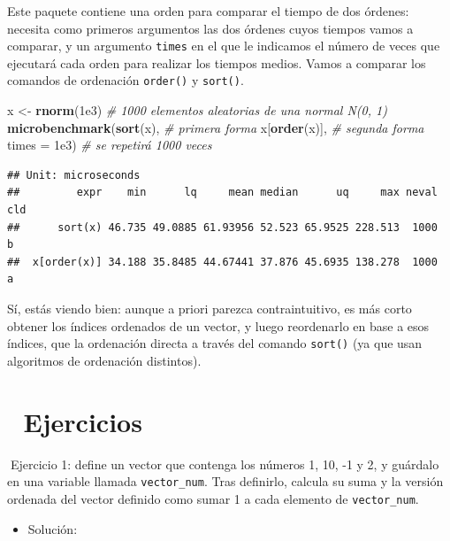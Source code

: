 \documentclass[11pt,]{book}
\newenvironment{Shaded}{\begin{snugshade}}{\end{snugshade}}
\newcommand{\CommentTok}[1]{\textcolor[rgb]{0.37,0.37,0.37}{\textit{#1}}}
\newcommand{\DataTypeTok}[1]{\textcolor[rgb]{0.27,0.27,0.27}{#1}}
\newcommand{\FloatTok}[1]{\textcolor[rgb]{0.06,0.06,0.06}{#1}}
\newcommand{\KeywordTok}[1]{\textcolor[rgb]{0.27,0.27,0.27}{\textbf{#1}}}
\newcommand{\NormalTok}[1]{#1}
\newcommand{\StringTok}[1]{\textcolor[rgb]{0.5,0.5,0.5}{#1}}
\providecommand{\tightlist}{%
  \setlength{\itemsep}{0pt}\setlength{\parskip}{0pt}}
\begin{document}
Este paquete contiene una orden para comparar el tiempo de dos órdenes: necesita como primeros argumentos las dos órdenes cuyos tiempos vamos a comparar, y un argumento \texttt{times} en el que le indicamos el número de veces que ejecutará cada orden para realizar los tiempos medios. Vamos a comparar los comandos de ordenación \texttt{order()} y \texttt{sort()}.

\begin{Shaded}
\begin{Highlighting}[]
\NormalTok{x <-}\StringTok{ }\KeywordTok{rnorm}\NormalTok{(}\FloatTok{1e3}\NormalTok{) }\CommentTok{# 1000 elementos aleatorias de una normal N(0, 1)}
\KeywordTok{microbenchmark}\NormalTok{(}\KeywordTok{sort}\NormalTok{(x), }\CommentTok{# primera forma}
\NormalTok{               x[}\KeywordTok{order}\NormalTok{(x)], }\CommentTok{# segunda forma}
               \DataTypeTok{times =} \FloatTok{1e3}\NormalTok{) }\CommentTok{# se repetirá 1000 veces}
\end{Highlighting}
\end{Shaded}

\begin{verbatim}
## Unit: microseconds
##         expr    min      lq     mean median      uq     max neval cld
##      sort(x) 46.735 49.0885 61.93956 52.523 65.9525 228.513  1000   b
##  x[order(x)] 34.188 35.8485 44.67441 37.876 45.6935 138.278  1000  a
\end{verbatim}

Sí, estás viendo bien: aunque a priori parezca contraintuitivo, es más corto obtener los índices ordenados de un vector, y luego reordenarlo en base a esos índices, que la ordenación directa a través del comando \texttt{sort()} (ya que usan algoritmos de ordenación distintos).

\hypertarget{ejercicios-1}{%
\section{📝 Ejercicios}\label{ejercicios-1}}

📝Ejercicio 1: define un vector que contenga los números 1, 10, -1 y 2, y guárdalo en una variable llamada \texttt{vector\_num}. Tras definirlo, calcula su suma y la versión ordenada del vector definido como sumar 1 a cada elemento de \texttt{vector\_num}.

\begin{itemize}
\tightlist
\item
  Solución:
\end{itemize}
\end{document}
